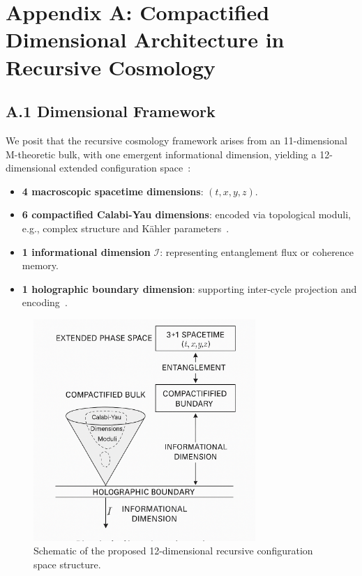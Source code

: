 \section*{Appendix A: Compactified Dimensional Architecture in Recursive Cosmology}

\subsection*{A.1 Dimensional Framework}

We posit that the recursive cosmology framework arises from an 11-dimensional M-theoretic bulk, with one emergent informational dimension, yielding a 12-dimensional extended configuration space~\cite{witten1995string, becker2007string}:

\begin{itemize}
  \item \textbf{4 macroscopic spacetime dimensions}: $(t, x, y, z)$.
  \item \textbf{6 compactified Calabi-Yau dimensions}: encoded via topological moduli, e.g., complex structure and Kähler parameters~\cite{candelas1985vacuum}.
  \item \textbf{1 informational dimension} $\mathcal{I}$: representing entanglement flux or coherence memory.
  \item \textbf{1 holographic boundary dimension}: supporting inter-cycle projection and encoding~\cite{ryu2006holographic}.
\end{itemize}

\begin{figure}[H]
\centering
\includegraphics[width=0.75\textwidth]{figures/12D_structure_diagram.png}
\caption{Schematic of the proposed 12-dimensional recursive configuration space structure.}
\label{fig:12D_structure}
\end{figure}

